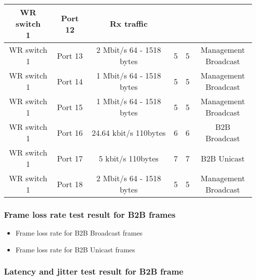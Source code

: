 \begin{table}[]
\begin{center}
\begin{tabular}{ | c | c | c | c | c | c | }
	\tabincell{c}{WR switch \\ 1} & Port 12 & Rx traffic &  &  & \\ \hline
   \tabincell{c}{WR switch \\ 1} & Port 13 & 2 Mbit/s 64 - 1518 bytes& 5 & 5 &  \tabincell{c}{Management \\ Broadcast} \\ \hline
	\tabincell{c}{WR switch \\ 1} & Port 14 & 1 Mbit/s 64 - 1518 bytes& 5 & 5 &  \tabincell{c}{Management \\ Broadcast} \\ \hline
	\tabincell{c}{WR switch \\ 1} & Port 15 & 1 Mbit/s 64 - 1518 bytes& 5 & 5 &  \tabincell{c}{Management \\ Broadcast} \\ \hline
   \tabincell{c}{WR switch \\ 1} & Port 16 & 24.64 kbit/s 110bytes & 6 & 6 & B2B Broadcast \\ \hline
	\tabincell{c}{WR switch \\ 1} & Port 17 & 5 kbit/s 110bytes & 7 & 7 & B2B Unicast \\ \hline
	\tabincell{c}{WR switch \\ 1} & Port 18 & 2 Mbit/s 64 - 1518 bytes& 5 & 5 &  \tabincell{c}{Management \\ Broadcast} \\ \hline
    
    \end{tabular}
\end{center}
\end{table}

\subsubsection{Frame loss rate test result for B2B frames}

\begin{itemize}
    \item Frame loss rate for B2B Broadcast frames

    \item Frame loss rate for B2B Unicast frames
\end{itemize}

\subsubsection{Latency and jitter test result for B2B frame}

